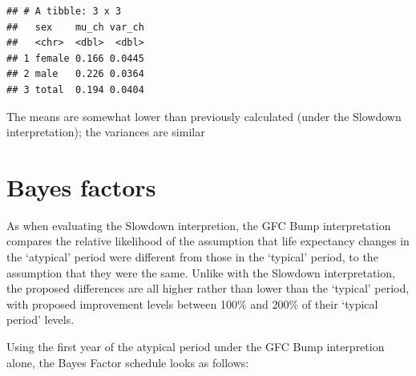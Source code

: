 \documentclass[]{article}
\begin{document}
\begin{verbatim}
## # A tibble: 3 x 3
##   sex    mu_ch var_ch
##   <chr>  <dbl>  <dbl>
## 1 female 0.166 0.0445
## 2 male   0.226 0.0364
## 3 total  0.194 0.0404
\end{verbatim}

The means are somewhat lower than previously calculated (under the
Slowdown interpretation); the variances are similar

\section{Bayes factors}\label{bayes-factors}

As when evaluating the Slowdown interpretion, the GFC Bump
interpretation compares the relative likelihood of the assumption that
life expectancy changes in the `atypical' period were different from
those in the `typical' period, to the assumption that they were the
same. Unlike with the Slowdown interpretation, the proposed differences
are all higher rather than lower than the `typical' period, with
proposed improvement levels between 100\% and 200\% of their `typical
period' levels.

Using the first year of the atypical period under the GFC Bump
interpretion alone, the Bayes Factor schedule looks as follows:
\end{document}

